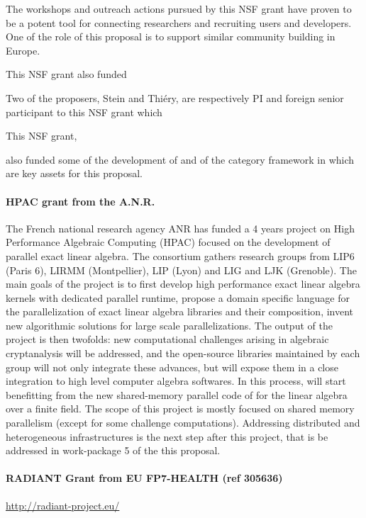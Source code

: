 The workshops and outreach actions pursued by this NSF grant have
proven to be a potent tool for connecting researchers and recruiting
\Sage users and developers. One of the role of this proposal is to
support similar community building in Europe.

This NSF grant also funded


Two of the proposers, Stein and Thiéry, are respectively PI and
foreign senior participant to this NSF grant which

This NSF grant,



 also funded some of the development of \SMC and of the
category framework in \Sage which are key assets for this proposal.


\paragraph{HPAC grant from the A.N.R.}

The French national research agency ANR has funded a 4 years project on High
Performance Algebraic Computing (HPAC) focused on the development of parallel
exact linear algebra. The consortium gathers research groups from LIP6 (Paris
6), LIRMM (Montpellier), LIP (Lyon) and LIG and LJK (Grenoble). The main goals
of the project is to first develop high performance exact linear algebra kernels
with dedicated parallel runtime, propose a domain specific language for the
parallelization of exact linear algebra libraries and their composition, invent
new algorithmic solutions for large scale parallelizations. The output of the
project is then twofolds: new computational challenges arising in algebraic
cryptanalysis will be addressed, and the open-source libraries maintained by each
group will not only integrate these advances, but will expose them in a close
integration to high level computer algebra softwares. In this process, \Sage will
start benefitting from the new shared-memory parallel code of \Linbox for the
linear algebra over a finite field.
The scope of this project is mostly focused on shared memory parallelism (except
for some challenge computations). Addressing distributed and heterogeneous
infrastructures is the next step after this project, that is be addressed in
work-package 5 of the this proposal.


\paragraph{RADIANT Grant from EU FP7-HEALTH (ref 305636)}
\url{http://radiant-project.eu/}


